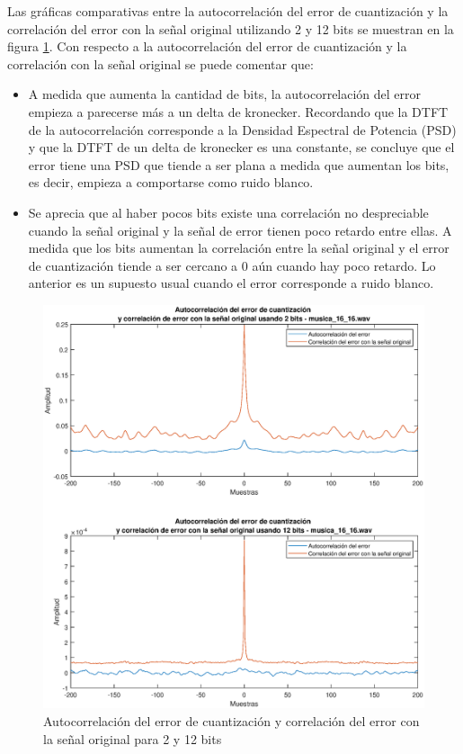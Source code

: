 \begin{enumerate}
\begin{enumerate}
    Las gráficas comparativas entre la autocorrelación del error de cuantización y la correlación del error con la señal original utilizando 2 y 12 bits se muestran en la figura \ref{fig:xcorr}.
\newpage    
    Con respecto a la autocorrelación del error de cuantización y la correlación con la señal original se puede comentar que:
    \begin{itemize}
        \item A medida que aumenta la cantidad de bits, la autocorrelación del error empieza a parecerse más a un delta de kronecker. Recordando que la DTFT de la autocorrelación corresponde a la Densidad Espectral de Potencia (PSD) y que la DTFT de un delta de kronecker es una constante, se concluye que el error tiene una PSD que tiende a ser plana a medida que aumentan los bits, es decir, empieza a comportarse como ruido blanco.  
        
        \item Se aprecia que al haber pocos bits existe una correlación no despreciable cuando la señal original y la señal de error tienen poco retardo entre ellas. A medida que los bits aumentan la correlación entre la señal original y el error de cuantización tiende a ser cercano a 0 aún cuando hay poco retardo. Lo anterior es un supuesto usual cuando el error corresponde a ruido blanco. 
    \end{itemize}
    
    \begin{figure}[H]
        \centering
        \includegraphics[width = 0.9\linewidth]{imagenes2/xcorr_error.eps}
        \caption{Autocorrelación del error de cuantización y correlación del error con la señal original para 2 y 12 bits}
        \label{fig:xcorr}
    \end{figure}
    

\end{enumerate}
\end{enumerate}
